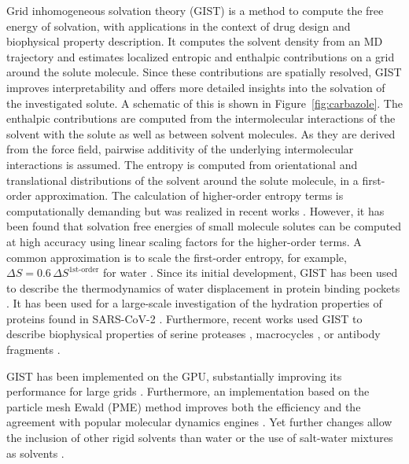 \documentclass[9pt,tutorial]{livecoms}
\begin{document}
Grid inhomogeneous solvation theory (GIST) \cite{Nguyen2012} is a method to compute the free energy of solvation, with applications in the context of drug design and biophysical property description.
It computes the solvent density from an MD trajectory and estimates localized entropic and enthalpic contributions on a grid around the solute molecule.
Since these contributions are spatially resolved, GIST improves interpretability and offers more detailed insights into the solvation of the investigated solute.
A schematic of this is shown in Figure~\ref{fig:carbazole}.
The enthalpic contributions are computed from the intermolecular interactions of the solvent with the solute as well as between solvent molecules. 
As they are derived from the force field, pairwise additivity of the underlying intermolecular interactions is assumed.
The entropy is computed from orientational and translational distributions of the solvent around the solute molecule, in a first-order approximation. 
The calculation of higher-order entropy terms is computationally demanding but was realized in recent works \cite{Nguyen2016-gist-second-order, Waibl2021-gist-salt}.
However, it has been found that solvation free energies of small molecule solutes can be computed at high accuracy using linear scaling factors for the higher-order terms. 
A common approximation is to scale the first-order entropy, for example, $\Delta S = 0.6\, \Delta S^\text{1st-order}$ for water \cite{Chen2021,Waibl2022-gist-solvents}.
Since its initial development, GIST has been used to describe the thermodynamics of water displacement in protein binding pockets \cite{Nguyen2016-gist-second-order,Ramsey2016,Balius2017-gist-ligand-discovery,Hufner-Wulsdorf2020-gist-drug-design}.
It has been used for a large-scale investigation of the hydration properties of proteins found in SARS-CoV-2 \cite{Olson2020-covid-gist}.
Furthermore, recent works used GIST to describe biophysical properties of serine proteases \cite{Kraml2019-gigist}, macrocycles \cite{Kamenik2020-gist-macrocycles}, or antibody fragments \cite{Waibl2021-gist-antibodies}.

GIST has been implemented on the GPU, substantially improving its performance for large grids \cite{Kraml2019-gigist}.
Furthermore, an implementation based on the particle mesh Ewald (PME) \cite{Darden1993-pme} method improves both the efficiency and the agreement with popular molecular dynamics engines \cite{Chen2021}. 
Yet further changes allow the inclusion of other rigid solvents than water \cite{Kraml2020,Waibl2022-gist-solvents} or the use of salt-water mixtures as solvents \cite{Waibl2021-gist-salt}.
\end{document}
